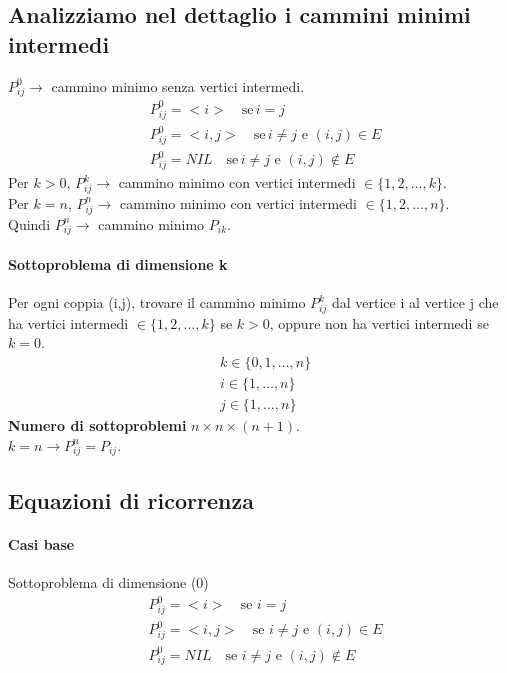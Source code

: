 \subsection*{Analizziamo nel dettaglio i cammini minimi intermedi}
$P^0_{ij} \rightarrow$ cammino minimo senza vertici intermedi.
\begin{align*}
  &P^0_{ij} = <i> \quad \text{se} \, i=j \\
  &P^0_{ij} = <i,j> \quad \text{se} \, i \neq j \text{ e } (i,j) \in E \\
  &P^0_{ij} = NIL \quad \text{se} \, i \neq j \text{ e } (i,j) \notin E
\end{align*}
Per $k > 0$, $P^k_{ij} \rightarrow$ cammino minimo con vertici intermedi $\in \{1,2,\dots,k\}$.\\
Per $k = n$, $P^n_{ij} \rightarrow$ cammino minimo con vertici intermedi $\in \{1,2,\dots,n\}$.\\
Quindi $P^n_{ij} \rightarrow$ cammino minimo $P_{ik}$.\\
\paragraph*{Sottoproblema di dimensione k} Per ogni coppia (i,j), trovare il cammino minimo
$P^k_{ij}$ dal vertice i al vertice j che ha vertici intermedi $\in \{1,2,\dots,k\}$ se $k>0$,
oppure non ha vertici intermedi se $k=0$.\\
\begin{align*}
    &k \in \{0,1,\dots,n\}\\
    &i \in \{1,\dots,n\}\\
    &j \in \{1,\dots,n\}
\end{align*}
\textbf{Numero di sottoproblemi} $n\times n \times (n+1)$.\\
$k = n \rightarrow P^n_{ij} = P_{ij}$.
\subsection{Equazioni di ricorrenza}
\paragraph*{Casi base} Sottoproblema di dimensione (0)
\begin{align*}
    &P^0_{ij} = <i> \quad \text{se } i = j\\
    &P^0_{ij} = <i, j> \quad \text{se } i \neq j \text{ e } (i,j) \in E\\
    &P^0_{ij} = NIL \quad \text{se } i \neq j \text{ e } (i,j) \notin E
\end{align*}
